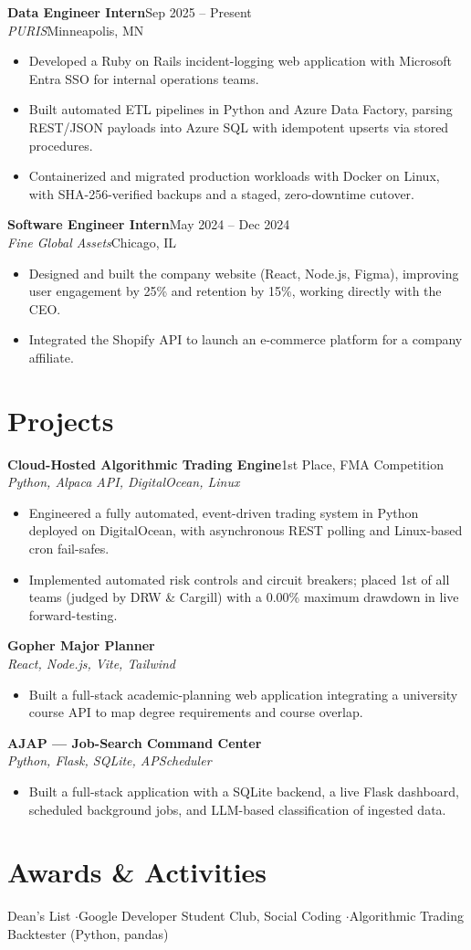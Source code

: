 \documentclass[letterpaper,10.5pt]{article}
\newcommand{\entry}[4]{\textbf{#1}\hfill{\small #2}\\\textit{\small #3}\hfill{\small #4}\par\vspace{1pt}}
\begin{document}
\entry{Data Engineer Intern}{Sep 2025 -- Present}{PURIS}{Minneapolis, MN}
\begin{itemize}
  \item Developed a Ruby on Rails incident-logging web application with Microsoft Entra SSO for internal operations teams.
  \item Built automated ETL pipelines in Python and Azure Data Factory, parsing REST/JSON payloads into Azure SQL with idempotent upserts via stored procedures.
  \item Containerized and migrated production workloads with Docker on Linux, with SHA-256-verified backups and a staged, zero-downtime cutover.
\end{itemize}

\entry{Software Engineer Intern}{May 2024 -- Dec 2024}{Fine Global Assets}{Chicago, IL}
\begin{itemize}
  \item Designed and built the company website (React, Node.js, Figma), improving user engagement by 25\% and retention by 15\%, working directly with the CEO.
  \item Integrated the Shopify API to launch an e-commerce platform for a company affiliate.
\end{itemize}

\section{Projects}
\entry{Cloud-Hosted Algorithmic Trading Engine}{1st Place, FMA Competition}{Python, Alpaca API, DigitalOcean, Linux}{}
\begin{itemize}
  \item Engineered a fully automated, event-driven trading system in Python deployed on DigitalOcean, with asynchronous REST polling and Linux-based cron fail-safes.
  \item Implemented automated risk controls and circuit breakers; placed 1st of all teams (judged by DRW \& Cargill) with a 0.00\% maximum drawdown in live forward-testing.
\end{itemize}

\entry{Gopher Major Planner}{}{React, Node.js, Vite, Tailwind}{}
\begin{itemize}
  \item Built a full-stack academic-planning web application integrating a university course API to map degree requirements and course overlap.
\end{itemize}

\entry{AJAP --- Job-Search Command Center}{}{Python, Flask, SQLite, APScheduler}{}
\begin{itemize}
  \item Built a full-stack application with a SQLite backend, a live Flask dashboard, scheduled background jobs, and LLM-based classification of ingested data.
\end{itemize}

\section{Awards \& Activities}
{\small Dean's List \quad$\cdot$\quad Google Developer Student Club, Social Coding \quad$\cdot$\quad Algorithmic Trading Backtester (Python, pandas)}
\end{document}
